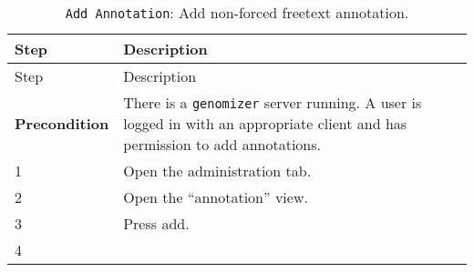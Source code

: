 \begin{longtable}[c]{@{}ll@{}}
\caption{\texttt{Add\ Annotation}: Add non-forced freetext
annotation.}\tabularnewline
\toprule
\begin{minipage}[b]{0.31\columnwidth}\raggedright\strut
Step
\strut\end{minipage} &
\begin{minipage}[b]{0.63\columnwidth}\raggedright\strut
Description
\strut\end{minipage}\tabularnewline
\midrule
\endfirsthead
\toprule
\begin{minipage}[b]{0.31\columnwidth}\raggedright\strut
Step
\strut\end{minipage} &
\begin{minipage}[b]{0.63\columnwidth}\raggedright\strut
Description
\strut\end{minipage}\tabularnewline
\midrule
\endhead
\begin{minipage}[t]{0.31\columnwidth}\raggedright\strut
\textbf{Precondition}
\strut\end{minipage} &
\begin{minipage}[t]{0.63\columnwidth}\raggedright\strut
There is a \texttt{genomizer} server running. A user is logged in with
an appropriate client and has permission to add annotations.
\strut\end{minipage}\tabularnewline
\begin{minipage}[t]{0.31\columnwidth}\raggedright\strut
1
\strut\end{minipage} &
\begin{minipage}[t]{0.63\columnwidth}\raggedright\strut
Open the administration tab.
\strut\end{minipage}\tabularnewline
\begin{minipage}[t]{0.31\columnwidth}\raggedright\strut
2
\strut\end{minipage} &
\begin{minipage}[t]{0.63\columnwidth}\raggedright\strut
Open the ``annotation'' view.
\strut\end{minipage}\tabularnewline
\begin{minipage}[t]{0.31\columnwidth}\raggedright\strut
3
\strut\end{minipage} &
\begin{minipage}[t]{0.63\columnwidth}\raggedright\strut
Press add.
\strut\end{minipage}\tabularnewline
\begin{minipage}[t]{0.31\columnwidth}\raggedright\strut
4
\strut\end{minipage} &

\end{longtable}

